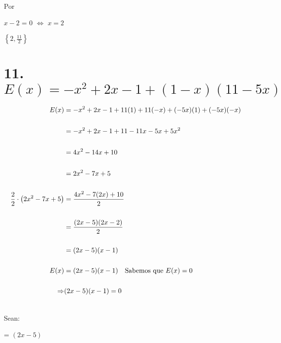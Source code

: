 \documentclass[12pt]{article}
\begin{document}
Por {}

\begin{center}
   
  $x-2$ = $0$  $\Leftrightarrow$ $ x= 2$ 
   
\end{center}

{}

\begin{center}
   
  $\left\{2,\frac{11}{2}\right\}$ 
   
\end{center}

\newpage

\section*{11. $E(x) = -x^{2} + 2x-1 + (1-x)(11-5x)$}

{}

\begin{equation*}
    \begin{split}
      E(x) & =-x^{2} + 2x-1 + 11(1)+11(-x)+(-5x)(1)+(-5x)(-x)\\\\ 
      & =-x^{2} + 2x-1 + 11-11x-5x+5x^{2}\\\\
      & = 4x^{2} - 14x + 10\\\\ 
      & = 2x^{2} - 7x + 5\\\\
      \frac{2}{2}\cdot\left(2x^{2} - 7x + 5\right) & = \frac{4x^{2}-7(2x) + 10}{2}\\\\
    & = \frac{(2x-5)(2x-2)}{2}\\\\
    & = (2x-5)(x-1)\\\\
E(x) & = (2x-5)(x-1) \quad \textup{Sabemos que $E(x)= 0$}\\\\
      \Rightarrow & (2x-5)(x-1) = 0 \\\\
    \end{split}
\end{equation*}

Sean: 
\begin{center}
   {} = $(2x-5)$   
\end{center}
\end{document}

